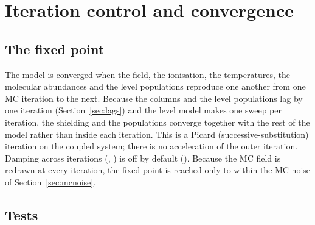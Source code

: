\section{Iteration control and convergence}
\label{sec:convergence}

\subsection{The fixed point}

The model is converged when the field, the ionisation, the temperatures, the
molecular abundances and the \Htwo{} level populations reproduce one another
from one MC iteration to the next. Because the columns and the level
populations lag by one iteration (Section~\ref{sec:lags}) and the level model
makes one sweep per iteration, the shielding and the populations converge
together with the rest of the model rather than inside each iteration. This
is a Picard (successive-substitution) iteration on the coupled system; there
is no acceleration of the outer iteration. Damping across iterations
(, ) is off by default
(). Because the MC field is redrawn at every iteration, the fixed
point is reached only to within the MC noise of
Section~\ref{sec:mcnoise}.

\subsection{Tests}

